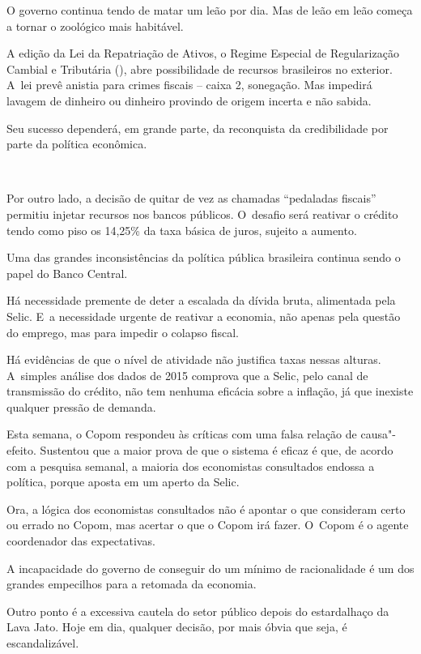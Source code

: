  

O governo continua tendo de matar um leão por dia. Mas de leão em leão
começa a tornar o zoológico mais habitável.

A edição da Lei da Repatriação de Ativos, o Regime Especial de
Regularização Cambial e Tributária (), abre possibilidade de
recursos brasileiros no exterior. A~lei prevê anistia para crimes
fiscais -- caixa 2, sonegação. Mas impedirá lavagem de dinheiro ou
dinheiro provindo de origem incerta e não sabida.

Seu sucesso dependerá, em grande parte, da reconquista da credibilidade
por parte da política econômica.

\asterisc{}~

Por outro lado, a decisão de quitar de vez as chamadas ``pedaladas
fiscais'' permitiu injetar recursos nos bancos públicos. O~desafio será
reativar o crédito tendo como piso os 14,25\% da taxa básica de juros,
sujeito a aumento.

Uma das grandes inconsistências da política pública brasileira continua
sendo o papel do Banco Central.

Há necessidade premente de deter a escalada da dívida bruta, alimentada
pela Selic. E~a necessidade urgente de reativar a economia, não apenas
pela questão do emprego, mas para impedir o colapso fiscal.

Há evidências de que o nível de atividade não justifica taxas nessas
alturas. A~simples análise dos dados de 2015 comprova que a Selic, pelo
canal de transmissão do crédito, não tem nenhuma eficácia sobre a
inflação, já que inexiste qualquer pressão de demanda.

Esta semana, o Copom respondeu às críticas com uma falsa relação de
causa"-efeito. Sustentou que a maior prova de que o sistema é eficaz é
que, de acordo com a pesquisa semanal, a maioria dos economistas
consultados endossa a política, porque aposta em um aperto da Selic.

Ora, a lógica dos economistas consultados não é apontar o que consideram
certo ou errado no Copom, mas acertar o que o Copom irá fazer. O~Copom é
o agente coordenador das expectativas.

\asterisc{}

A incapacidade do governo de conseguir do  um mínimo de racionalidade
é um dos grandes empecilhos para a retomada da economia.

Outro ponto é a excessiva cautela do setor público depois do
estardalhaço da Lava Jato. Hoje em dia, qualquer decisão, por mais óbvia
que seja, é escandalizável.

